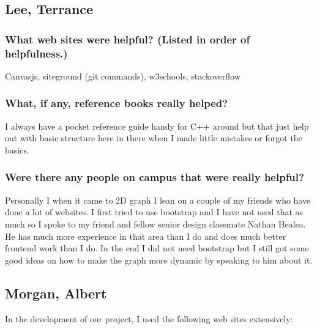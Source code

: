 \documentclass[10pt,draftclsnofoot,onecolumn]{IEEEtran}
\begin{document}

\subsection{Lee, Terrance}

\subsubsection{What web sites were helpful? (Listed in order of helpfulness.)}
Canvasjs, siteground (git commands), w3schools, stackoverflow
\subsubsection{What, if any, reference books really helped?}
I always have a pocket reference guide handy for C++ around but that just help out with basic structure here in there when I made little mistakes or forgot the basics.  
\subsubsection{Were there any people on campus that were really helpful?}
Personally I when it came to 2D graph I lean on a couple of my friends who have done a lot of websites. I first tried to use bootstrap and I have not used that as much so I spoke to my friend and fellow senior design classmate Nathan Healea.  He has much more experience in that area than I do and does much better frontend work than I do.  In the end I did not need bootstrap but I still got some good ideas on how to make the graph more dynamic by speaking to him about it.  

\subsection{Morgan, Albert}


In the development of our project, I used the following web sites extensively:
\end{document}
